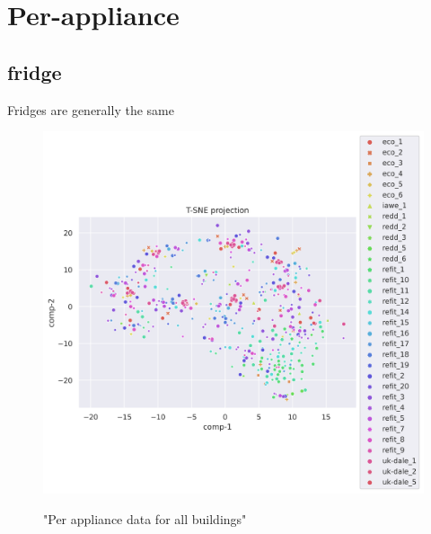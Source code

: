 \section{Per-appliance}

\subsection{fridge}
Fridges are generally the same 

\begin{figure}[H]
	\centering
	\caption{"Per appliance data for all buildings"}
	\includegraphics[width=1.2\textwidth]{Figures/TSNE/TSNE_per_appliance/all/scatter_all_fridge_freeezer_fridge freezer.png}
	\label{fig:tsne_pa_scatter_all_fridge}
\end{figure}

